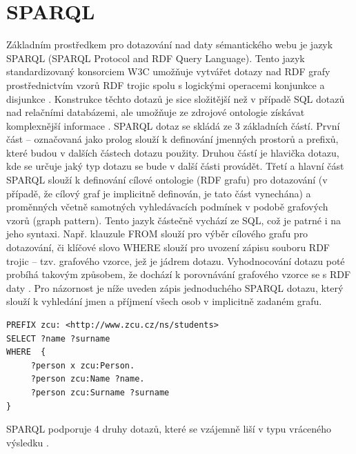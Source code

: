 \documentclass{projekt}
\begin{document}
\section{SPARQL}
\hspace{0.65cm}Základním prostředkem pro dotazování nad daty sémantického webu je jazyk SPARQL (SPARQL Protocol and RDF Query Language). Tento jazyk standardizovaný konsorciem W3C umožňuje vytvářet dotazy nad RDF grafy prostřednictvím vzorů RDF trojic spolu s logickými operacemi konjunkce a disjunkce \cite{_2}. Konstrukce těchto dotazů je sice složitější než v případě SQL dotazů nad relačními databázemi, ale umožňuje ze zdrojové ontologie získávat komplexnější informace \cite{_3}. SPARQL dotaz se skládá ze 3 základních částí. První část – označovaná jako prolog slouží k definování jmenných prostorů a prefixů, které budou v dalších částech dotazu použity. Druhou částí je hlavička dotazu, kde se určuje jaký typ dotazu se bude v další části provádět. Třetí a hlavní část SPARQL slouží k definování cílové ontologie (RDF grafu) pro dotazování (v případě, že cílový graf je implicitně definován, je tato část vynechána) a proměnných včetně samotných vyhledávacích podmínek v podobě grafových vzorů (graph pattern)\cite{_2}.
Tento jazyk částečně vychází ze SQL, což je patrné i na jeho syntaxi. Např. klauzule FROM slouží pro výběr cílového grafu pro dotazování, či klíčové slovo WHERE slouží pro uvození zápisu souboru RDF trojic – tzv. grafového vzorce, jež je jádrem dotazu. Vyhodnocování dotazu poté probíhá takovým způsobem, že dochází k porovnávání grafového vzorce se s RDF daty \cite{_13}. 
Pro názornost je níže uveden zápis jednoduchého SPARQL dotazu, který slouží k vyhledání jmen a příjmení všech osob v implicitně zadaném grafu.

\begin{verbatim}
PREFIX zcu: <http://www.zcu.cz/ns/students>
SELECT ?name ?surname
WHERE  {
     ?person x zcu:Person.
     ?person zcu:Name ?name.
     ?person zcu:Surname ?surname
}
\end{verbatim}


SPARQL podporuje 4 druhy dotazů, které se vzájemně liší v typu vráceného výsledku \cite{_13}.
\end{document}

